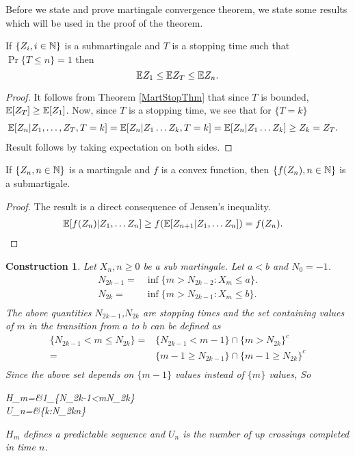 \documentclass[a4paper,10pt,english]{article}
\newtheorem{con}[thm]{Construction}
\begin{document}
Before we state and prove martingale convergence theorem, we state some results which will be used in the proof of the theorem.
\begin{lem}
\label{StoppingTimeBound}
If $\{Z_i, i \in \mathbb{N} \}$ is  a submartingale and $T$ is a stopping time such that $\Pr\{T \leq n\}=1$ then
\begin{equation*}
 \mathbb{E} Z_1 \leq \mathbb{E} Z_T \leq \mathbb{E} Z_n.
\end{equation*}
\end{lem}
\begin{proof}
It follows from Theorem \ref{MartStopThm} that since $T$ is bounded, $\mathbb{E}[Z_T] \geq \mathbb{E}[Z_1]$. Now, since $T$ is a stopping time, we see that for $\{T = k\}$
\begin{eqnarray*}
\mathbb{E}[Z_n|Z_1, \hdots ,Z_T,T=k]&=\mathbb{E}[Z_n|Z_1 \hdots Z_k,T=k] = \mathbb{E}[Z_n|Z_1 \hdots Z_k] \geq Z_k = Z_T.
\end{eqnarray*}
Result follows by taking expectation on both sides.
\end{proof}
\begin{lem}
\label{ConvexFuncSubmart}
If $\{Z_n,n \in \mathbb{N}\}$ is a martingale and $f$ is a convex function, then $\{f(Z_n),n \in \mathbb{N}\}$ is a submartigale.
\end{lem}
\begin{proof}
The result is a direct consequence of Jensen's inequality.
\begin{align*}
\mathbb{E}[f(Z_n)|Z_1, \hdots Z_n] &\geq f(\mathbb{E}[Z_{n+1}|Z_1, \hdots Z_n])=f(Z_n).
\end{align*}
\end{proof}
\begin{con}
	Let ${X_n,n\geq0}$ be a sub martingale. Let $a< b$ and $N_0  = -1$.
	   \begin{eqnarray*}
		N_{2k-1}=&\inf\{m>N_{2k-2}:X_m\leq a \}.\\
		N_{2k}=&\inf\{m>N_{2k-1}:X_m\leq b \}.\\
		\end{eqnarray*}
		The above quantities $N_{2k-1}$,$N_{2k}$ are stopping times and the set containing values of $m$ in the transition from $a$ to $b$ can be defined as
		\begin{eqnarray*}
		\{N_{2k-1}<m\leq N_{2k} \}=&\{N_{2k-1}<m-1\} \cap \{m>N_{2k}\}^{c}\\
		=&\{m-1\geq N_{2k-1}\}\cap\{m-1\geq N_{2k}\}^{c}\\		
		\end{eqnarray*}
		Since the above set depends on $\{m-1\}$ values instead of $\{m\}$ values, So
		\begin{flalign*}
			H_m=&1_{\{N_{2k-1}<m\leq  N_{2k}\}}\\
			U_n=&\sup\{k:N_{2k}\leq n\}
		\end{flalign*}
		 $H_m$ defines a predictable sequence and $U_n$ is the number of up crossings completed in time $n$.
\end{con}
\end{document}
